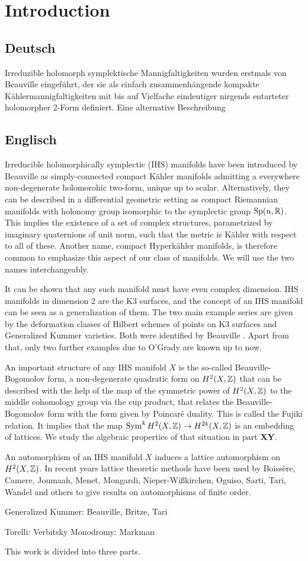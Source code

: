 \section{Introduction}
\subsection{Deutsch}
Irreduzible holomorph symplektische Mannigfaltigkeiten wurden erstmals von Beauville \cite{Beauville} eingeführt, der sie als einfach zusammenh\"angende kompakte K\"ahlermannigfaltigkeiten mit bis auf Vielfache eindeutiger nirgends entarteter holomorpher 2-Form definiert. 
Eine alternative Beschreibung 
\subsection{Englisch}
Irreducible holomorphically symplectic (IHS) manifolds have been introduced by Beauville \cite{Beauville} as simply-connected compact K\"ahler manifolds admitting a everywhere non-degenerate holomorohic two-form, unique up to scalar. 
Alternatively, they can be described in a differential geometric setting as compact Riemannian manifolds with holonomy group isomorphic to the symplectic group $\operatorname{Sp}(n,\mathbb{R})$. This implies the existence of a set of complex structures, parametrized by imaginary quaternions of unit norm, such that the metric is K\"ahler with respect to all of these. 
Another name, compact Hyperk\"ahler manifolds, is therefore common to emphasize this aspect of our class of manifolds. We will use the two names interchangeably.

It can be shown that any such manifold must have even complex dimension. IHS manifolds in dimension 2 are the K3 surfaces, and the concept of an IHS manifold can be seen as a generalization of them. The two main example series are given by the deformation classes of Hilbert schemes of points on K3 surfaces and Generalized Kummer varieties. Both were identified by Beauville \cite{Beauville}. Apart from that, only two further examples due to O'Grady are known up to now.

An important structure of any IHS manifold $X$ is the so-called Beauville-Bogomolov form, a non-degenerate quadratic form on $H^2(X,\mathbb{Z})$ that can be described with the help of the map of the symmetric power of $H^2(X,\mathbb{Z})$ to the middle cohomology group via the cup product, that relates the Beauville-Bogomolov form with the form given by Poincar\'e duality. This is called the Fujiki relation. It implies that the map $\operatorname{Sym}^k H^2(X,\mathbb{Z})\rightarrow H^{2k}(X,\mathbb{Z})$ is an embedding of lattices. We study the algebraic properties of that situation in part \textbf{XY}.

An automorphism of an IHS manifold $X$ induces a lattice automorphism on $H^2(X,\mathbb{Z})$.
In recent years lattice theoretic methods have been used by
Boiss\`ere, Camere, Joumaah, Menet, Mongardi, Nieper-Wi\ss kirchen, Oguiso, Sarti, Tari, Wandel and others to give results on
automorphisms of finite order. 


Generalized Kummer: Beauville, Britze, Tari

Torelli: Verbitsky
Monodromy: Markman


This work is divided into three parts. 